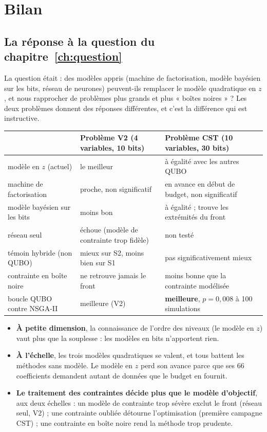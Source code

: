 \chapter{Bilan}\label{ch:bilan}

\section{La réponse à la question du chapitre~\ref{ch:question}}
La question était : des modèles appris (machine de factorisation, modèle bayésien sur les bits, réseau de neurones) peuvent-ils remplacer le modèle quadratique en $z$, et nous rapprocher de problèmes plus grands et plus « boîtes noires » ? Les deux problèmes donnent des réponses différentes, et c'est la différence qui est instructive.
\begin{center}
\renewcommand{\arraystretch}{1.25}
\small
\begin{tabularx}{\linewidth}{>{\raggedright\arraybackslash}p{3.3cm} >{\raggedright\arraybackslash}X >{\raggedright\arraybackslash}X}
\toprule
& Problème V2 (4 variables, 10 bits) & Problème CST (10 variables, 30 bits) \\
\midrule
modèle en $z$ (actuel) & le meilleur & à égalité avec les autres QUBO \\
machine de factorisation & proche, non significatif & en avance en début de budget, non significatif \\
modèle bayésien sur les bits & moins bon & à égalité ; trouve les extrémités du front \\
réseau seul & échoue (modèle de contrainte trop fidèle) & non testé \\
témoin hybride (non QUBO) & mieux sur S2, moins bien sur S1 & pas significativement mieux \\
contrainte en boîte noire & ne retrouve jamais le front & moins bonne que la contrainte modélisée \\
boucle QUBO contre NSGA-II & meilleure (V2) & \textbf{meilleure}, $p=0{,}008$ à 100 simulations \\
\bottomrule
\end{tabularx}
\end{center}
\begin{itemize}
\item \textbf{À petite dimension}, la connaissance de l'ordre des niveaux (le modèle en $z$) vaut plus que la souplesse : les modèles en bits n'apportent rien.
\item \textbf{À l'échelle}, les trois modèles quadratiques se valent, et tous battent les méthodes sans modèle. Le modèle en $z$ perd son avance parce que ses 66 coefficients demandent autant de données que le budget en fournit.
\item \textbf{Le traitement des contraintes décide plus que le modèle d'objectif}, aux deux échelles : un modèle de contrainte trop sévère exclut le front (réseau seul, V2) ; une contrainte oubliée détourne l'optimisation (première campagne CST) ; une contrainte en boîte noire rend la méthode trop prudente.
\end{itemize}

